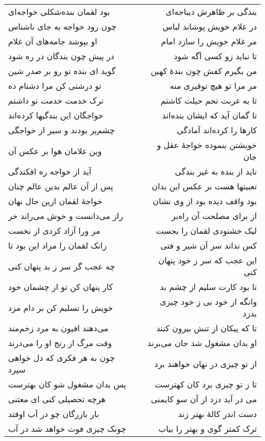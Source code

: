 \begin{center}
\begin{longtable}{l p{0.5cm} r}
بود لقمان بنده‌شکلی خواجه‌ای
&&
بندگی بر ظاهرش دیباجه‌ای
\\
چون رود خواجه به جای ناشناس
&&
در غلام خویش پوشاند لباس
\\
او بپوشد جامه‌های آن غلام
&&
مر غلام خویش را سازد امام
\\
در پیش چون بندگان در ره شود
&&
تا نباید زو کسی آگه شود
\\
گوید ای بنده تو رو بر صدر شین
&&
من بگیرم کفش چون بندهٔ کهین
\\
تو درشتی کن مرا دشنام ده
&&
مر مرا تو هیچ توقیری منه
\\
ترک خدمت خدمت تو داشتم
&&
تا به غربت تخم حیلت کاشتم
\\
خواجگان این بندگیها کرده‌اند
&&
تا گمان آید که ایشان بنده‌اند
\\
چشم‌پر بودند و سیر از خواجگی
&&
کارها را کرده‌اند آمادگی
\\
وین غلامان هوا بر عکس آن
&&
خویشتن بنموده خواجهٔ عقل و جان
\\
آید از خواجه ره افکندگی
&&
ناید از بنده به غیر بندگی
\\
پس از آن عالم بدین عالم چنان
&&
تعبیتها هست بر عکس این بدان
\\
خواجهٔ لقمان ازین حال نهان
&&
بود واقف دیده بود از وی نشان
\\
راز می‌دانست و خوش می‌راند خر
&&
از برای مصلحت آن راه‌بر
\\
مر ورا آزاد کردی از نخست
&&
لیک خشنودی لقمان را بجست
\\
زانک لقمان را مراد این بود تا
&&
کس نداند سر آن شیر و فتی
\\
چه عجب گر سر ز بد پنهان کنی
&&
این عجب که سر ز خود پنهان کنی
\\
کار پنهان کن تو از چشمان خود
&&
تا بود کارت سلیم از چشم بد
\\
خویش را تسلیم کن بر دام مزد
&&
وانگه از خود بی ز خود چیزی بدزد
\\
می‌دهند افیون به مرد زخم‌مند
&&
تا که پیکان از تنش بیرون کنند
\\
وقت مرگ از رنج او را می‌درند
&&
او بدان مشغول شد جان می‌برند
\\
چون به هر فکری که دل خواهی سپرد
&&
از تو چیزی در نهان خواهند برد
\\
پس بدان مشغول شو کان بهترست
&&
تا ز تو چیزی برد کان کهترست
\\
هرچه تحصیلی کنی ای معتنی
&&
می در آید دزد از آن سو کایمنی
\\
بار بازرگان چو در آب اوفتد
&&
دست اندر کالهٔ بهتر زند
\\
چونک چیزی فوت خواهد شد در آب
&&
ترک کمتر گوی و بهتر را بیاب
\\
\end{longtable}
\end{center}
